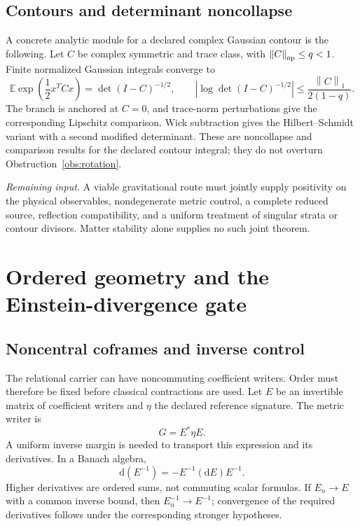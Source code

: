\documentclass[11pt,a4paper,oneside]{book}
\theoremstyle{plain}
\theoremstyle{definition}
\theoremstyle{remark}
\newcommand{\E}{\mathbb E}
\newcommand{\dd}{\mathrm d}
\newcommand{\norm}[1]{\left\lVert#1\right\rVert}
\newcommand{\abs}[1]{\left\lvert#1\right\rvert}
\newcommand{\gate}[1]{\par\smallskip\noindent\textit{Remaining input.} #1\par\smallskip}
\begin{document}
\section{Contours and determinant noncollapse}
A concrete analytic module for a declared complex Gaussian contour is the following. Let $C$ be complex symmetric and trace class, with $\norm{C}_{\rm op}\le q<1$. Finite normalized Gaussian integrals converge to
\begin{equation}
 \E\exp\!\left(\frac12x^TCx\right)=\det(I-C)^{-1/2},
 \qquad
 \abs{\log\det(I-C)^{-1/2}}
 \le\frac{\norm{C}_1}{2(1-q)}.
 \label{eq:complex-det}
\end{equation}
The branch is anchored at $C=0$, and trace-norm perturbations give the corresponding Lipschitz comparison. Wick subtraction gives the Hilbert--Schmidt variant with a second modified determinant. These are noncollapse and comparison results for the declared contour integral; they do not overturn Obstruction~\ref{obs:rotation}. \cite{R11,R12}

\gate{A viable gravitational route must jointly supply positivity on the physical observables, nondegenerate metric control, a complete reduced source, reflection compatibility, and a uniform treatment of singular strata or contour divisors. Matter stability alone supplies no such joint theorem.}


\chapter{Ordered geometry and the Einstein-divergence gate}
\label{ch:cartan}
\section{Noncentral coframes and inverse control}
The relational carrier can have noncommuting coefficient writers. Order must therefore be fixed before classical contractions are used. Let $E$ be an invertible matrix of coefficient writers and $\eta$ the declared reference signature. The metric writer is
\begin{equation}
 G=E^*\eta E.
 \label{eq:ordered-metric}
\end{equation}
A uniform inverse margin is needed to transport this expression and its derivatives. In a Banach algebra,
\begin{equation}
 \dd(E^{-1})=-E^{-1}(\dd E)E^{-1}.
 \label{eq:inverse-coframe}
\end{equation}
Higher derivatives are ordered sums, not commuting scalar formulas. If $E_n\to E$ with a common inverse bound, then $E_n^{-1}\to E^{-1}$; convergence of the required derivatives follows under the corresponding stronger hypotheses. \cite{R13}
\end{document}
